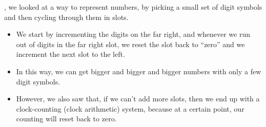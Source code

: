 \documentclass[../../../main.tex]{subfiles}
\begin{document}
, we looked at a way to represent numbers, by picking a small set of digit symbols and then cycling through them in slots. 

\begin{itemize}

  \item We start by incrementing the digits on the far right, and whenever we run out of digits in the far right slot, we reset the slot back to ``zero'' and we increment the next slot to the left.
  
  \item In this way, we can get bigger and bigger and bigger numbers with only a few digit symbols.
  
  \item However, we also saw that, if we can't add more slots, then we end up with a clock-counting (clock arithmetic) system, because at a certain point, our counting will reset back to zero. 

\end{itemize}
\end{document}
